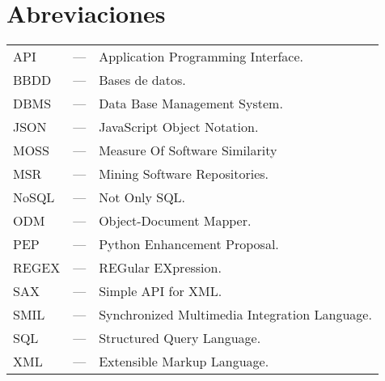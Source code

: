 
\chapter*{Abreviaciones}


\begin{tabular}{ l c l }
API   & --- & Application Programming Interface.\\
BBDD  & --- & Bases de datos.\\
DBMS  & --- & Data Base Management System. \\
JSON  & --- & JavaScript Object Notation.\\
MOSS  & --- & Measure Of Software Similarity\\
MSR   & --- & Mining Software Repositories.\\
NoSQL & --- & Not Only SQL.\\
ODM   & --- & Object-Document Mapper.\\
PEP   & --- & Python Enhancement Proposal.\\
REGEX & --- & REGular EXpression.\\
SAX	  & --- & Simple API for XML. \\
SMIL  & --- & Synchronized Multimedia Integration Language.\\
SQL   & --- & Structured Query Language.\\
XML   & --- & Extensible Markup Language.\\
\end{tabular}

